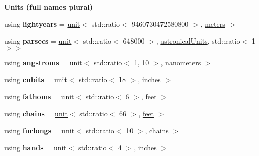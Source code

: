 \begin{Indent}{\bf Units (full names plural)}
\begin{DoxyCompactItemize}
\item 
\hypertarget{namespaceunits_1_1length_a81d9a70ce3e66440c100b3fcd4a99f31}{}using {\bfseries lightyears} = \hyperlink{structunits_1_1unit}{unit}$<$ std\+::ratio$<$ 9460730472580800 $>$, \hyperlink{structunits_1_1unit}{meters} $>$\label{namespaceunits_1_1length_a81d9a70ce3e66440c100b3fcd4a99f31}

\item 
\hypertarget{namespaceunits_1_1length_ab382bb2244169857ebe78571a5b2bf71}{}using {\bfseries parsecs} = \hyperlink{structunits_1_1unit}{unit}$<$ std\+::ratio$<$ 648000 $>$, \hyperlink{structunits_1_1unit}{astronical\+Units}, std\+::ratio$<$-\/1 $>$$>$\label{namespaceunits_1_1length_ab382bb2244169857ebe78571a5b2bf71}

\item 
\hypertarget{namespaceunits_1_1length_a76e680ba03f2df7f2f6a715d2477ca2f}{}using {\bfseries angstroms} = \hyperlink{structunits_1_1unit}{unit}$<$ std\+::ratio$<$ 1, 10 $>$, nanometers $>$\label{namespaceunits_1_1length_a76e680ba03f2df7f2f6a715d2477ca2f}

\item 
\hypertarget{namespaceunits_1_1length_ad6fbf43235d19818f87ff2b53ea14dbf}{}using {\bfseries cubits} = \hyperlink{structunits_1_1unit}{unit}$<$ std\+::ratio$<$ 18 $>$, \hyperlink{structunits_1_1unit}{inches} $>$\label{namespaceunits_1_1length_ad6fbf43235d19818f87ff2b53ea14dbf}

\item 
\hypertarget{namespaceunits_1_1length_a5cbf90ccd9917e21aefe789978ac61b0}{}using {\bfseries fathoms} = \hyperlink{structunits_1_1unit}{unit}$<$ std\+::ratio$<$ 6 $>$, \hyperlink{structunits_1_1unit}{feet} $>$\label{namespaceunits_1_1length_a5cbf90ccd9917e21aefe789978ac61b0}

\item 
\hypertarget{namespaceunits_1_1length_a17268895360fd7ed46b07498d70be55b}{}using {\bfseries chains} = \hyperlink{structunits_1_1unit}{unit}$<$ std\+::ratio$<$ 66 $>$, \hyperlink{structunits_1_1unit}{feet} $>$\label{namespaceunits_1_1length_a17268895360fd7ed46b07498d70be55b}

\item 
\hypertarget{namespaceunits_1_1length_a1c195ec83371cd6990a78ec3ad62b59f}{}using {\bfseries furlongs} = \hyperlink{structunits_1_1unit}{unit}$<$ std\+::ratio$<$ 10 $>$, \hyperlink{structunits_1_1unit}{chains} $>$\label{namespaceunits_1_1length_a1c195ec83371cd6990a78ec3ad62b59f}

\item 
\hypertarget{namespaceunits_1_1length_a8ffaf8d63384f87ecb6501cb43f9801b}{}using {\bfseries hands} = \hyperlink{structunits_1_1unit}{unit}$<$ std\+::ratio$<$ 4 $>$, \hyperlink{structunits_1_1unit}{inches} $>$\label{namespaceunits_1_1length_a8ffaf8d63384f87ecb6501cb43f9801b}


\end{DoxyCompactItemize}
\end{Indent}
